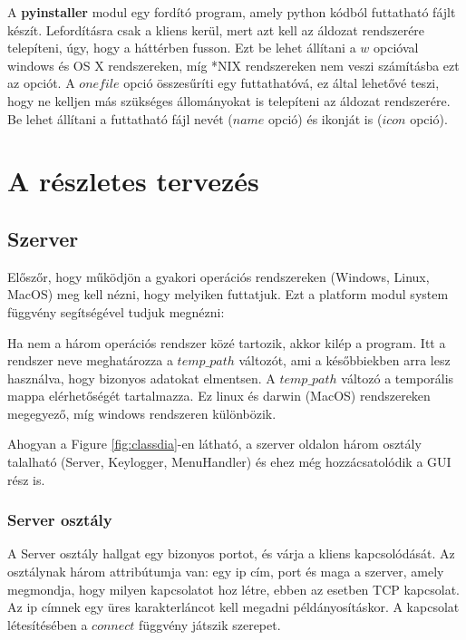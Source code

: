\documentclass[a4paper, 11pt]{article}
\begin{document}
A \textbf{pyinstaller} modul egy fordító program, amely python kódból futtatható fájlt készít. Lefordításra csak a kliens kerül, mert azt kell az áldozat rendszerére telepíteni, úgy, hogy a háttérben fusson. Ezt be lehet állítani a $w$ opcióval windows és OS X rendszereken, míg *NIX rendszereken nem veszi számításba ezt az opciót. A $onefile$ opció összesűríti egy futtathatóvá, ez által lehetővé teszi, hogy ne kelljen más szükséges állományokat is telepíteni az áldozat rendszerére. Be lehet állítani a futtatható fájl nevét ($name$ opció) és ikonját is ($icon$ opció).



\section{A részletes tervezés}\label{sec:plan}
\subsection{Szerver}\label{subsec:server}
Előszőr, hogy működjön a gyakori operációs rendszereken (Windows, Linux, MacOS) meg kell nézni, hogy melyiken futtatjuk. Ezt a platform modul system függvény segítségével tudjuk megnézni:



\noindent Ha nem a három operációs rendszer közé tartozik, akkor kilép a program. Itt a rendszer neve meghatározza a $temp\_path$ változót, ami a későbbiekben arra lesz használva, hogy bizonyos adatokat elmentsen. A $temp\_path$ változó a temporális mappa elérhetőségét tartalmazza. Ez linux és darwin (MacOS) rendszereken megegyező, míg windows rendszeren különbözik.

Ahogyan a Figure \ref{fig:classdia}-en látható, a szerver oldalon három osztály talalható (Server, Keylogger, MenuHandler) és ehez még hozzácsatolódik a GUI rész is.

\subsubsection{Server osztály}\label{subsubsec:serverclass}
A Server osztály hallgat egy bizonyos portot, és várja a kliens kapcsolódását. Az osztálynak három attribútumja van: egy ip cím, port és maga a szerver, amely megmondja, hogy milyen kapcsolatot hoz létre, ebben az esetben TCP kapcsolat. Az ip címnek egy üres karakterláncot kell megadni példányosításkor. A kapcsolat létesítésében a $connect$ függvény játszik szerepet.
\end{document}
